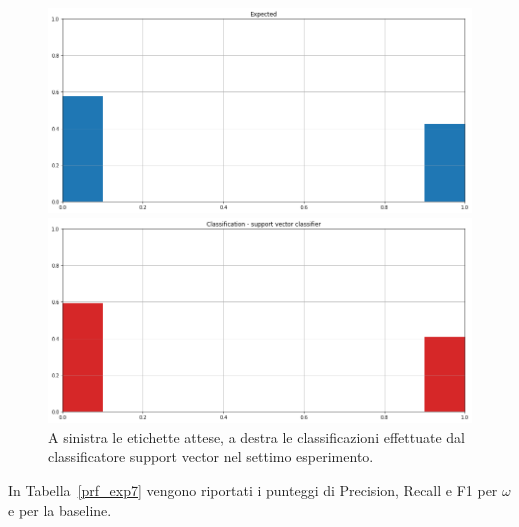 \documentclass[12pt]{report}
\theoremstyle{definition}
\begin{document}
\begin{figure}
\centering
    \begin{minipage}{0.48\textwidth}
        \includegraphics[width=\linewidth]{images/experiment kaggle/expected_classification.png}
    \end{minipage}
    \begin{minipage}{0.48\textwidth}
        \includegraphics[width=\linewidth]{images/experiment kaggle/prediction_classification_svc.png}
    \end{minipage}
    \caption{A sinistra le etichette attese, a destra le classificazioni effettuate dal classificatore support vector nel settimo esperimento.}
    \label{svc_exp7}
\end{figure} 
In Tabella~\ref{prf_exp7} vengono riportati i punteggi di Precision, Recall e F1 per $\omega$ e per la baseline.
\end{document}
